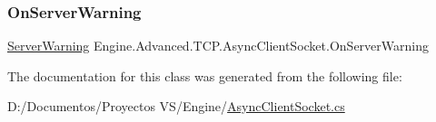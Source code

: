 \mbox{\label{class_engine_1_1_advanced_1_1_t_c_p_1_1_async_client_socket_ac7907c405f3df4e630fade199c29fe95}} 
\subsubsection{\texorpdfstring{OnServerWarning}{OnServerWarning}}
{\footnotesize\ttfamily \mbox{\hyperlink{class_engine_1_1_advanced_1_1_t_c_p_1_1_async_client_socket_a519c68733927ee8465d4d38726c137f8}{Server\+Warning}} Engine.\+Advanced.\+T\+C\+P.\+Async\+Client\+Socket.\+On\+Server\+Warning}



The documentation for this class was generated from the following file\+:\begin{DoxyCompactItemize}
\item 
D\+:/\+Documentos/\+Proyectos V\+S/\+Engine/\mbox{\hyperlink{_async_client_socket_8cs}{Async\+Client\+Socket.\+cs}}\end{DoxyCompactItemize}
